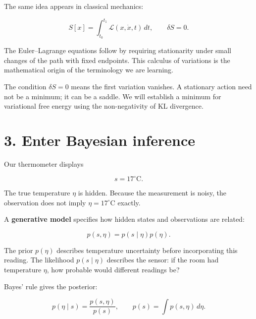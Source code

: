 \documentclass[
  letterpaper,
  DIV=11,
  numbers=noendperiod]{scrreprt}
\begin{document}
The same idea appears in classical mechanics:

\[
S[x]=\int_{t_0}^{t_1}\mathcal L(x,\dot x,t)\,dt,
\qquad \delta S=0.
\]

The Euler--Lagrange equations follow by requiring stationarity under
small changes of the path with fixed endpoints. This calculus of
variations is the mathematical origin of the terminology we are
learning.

\begin{tcolorbox}[enhanced jigsaw, arc=.35mm, bottomrule=.15mm, bottomtitle=1mm, breakable, colback=white, colbacktitle=quarto-callout-important-color!10!white, colframe=quarto-callout-important-color-frame, coltitle=black, left=2mm, leftrule=.75mm, opacityback=0, opacitybacktitle=0.6, rightrule=.15mm, title=\textcolor{quarto-callout-important-color}{\faExclamation}\hspace{0.5em}{Stationary does not always mean minimum}, titlerule=0mm, toprule=.15mm, toptitle=1mm]

The condition \(\delta S=0\) means the first variation vanishes. A
stationary action need not be a minimum; it can be a saddle. We will
establish a minimum for variational free energy using the non-negativity
of KL divergence.

\end{tcolorbox}

\section{3. Enter Bayesian inference}\label{enter-bayesian-inference}

Our thermometer displays

\[
s=17^\circ\mathrm C.
\]

The true temperature \(\eta\) is hidden. Because the measurement is
noisy, the observation does not imply \(\eta=17^\circ\mathrm C\)
exactly.

A \textbf{generative model} specifies how hidden states and observations
are related:

\[
p(s,\eta)=p(s\mid\eta)p(\eta).
\]

The prior \(p(\eta)\) describes temperature uncertainty before
incorporating this reading. The likelihood \(p(s\mid\eta)\) describes
the sensor: if the room had temperature \(\eta\), how probable would
different readings be?

Bayes' rule gives the posterior:

\[
p(\eta\mid s)=\frac{p(s,\eta)}{p(s)},
\qquad
p(s)=\int p(s,\eta)\,d\eta.
\]
\end{document}
